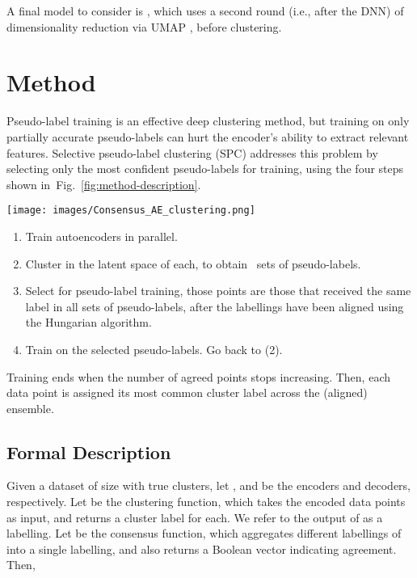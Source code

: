 \documentclass[runningheads]{llncs}
\begin{document}
A final model to consider is \cite{mcconville2019n2d}, which uses a second round (i.e., after the DNN) of dimensionality reduction via UMAP \cite{mcinnes2018umap}, before clustering.



 \section{Method} \label{sec:method}
 Pseudo-label training is an effective deep clustering method, but training on only partially accurate pseudo-labels can hurt the encoder's ability to extract relevant features. Selective pseudo-label clustering (SPC) addresses this problem by selecting only the most confident pseudo-labels for training, using the four steps shown in~Fig.~\ref{fig:method-description}. 

\begin{figure*}[t]
    \centering
    \texttt{[image: images/Consensus\_AE\_clustering.png]}
    \caption{ \small The complete SPC method. (1) Pretrain autoencoders. (2)~Perform multiple clusterings independently. (3) Identify agreed points as those that receive the same label in all ensemble members. (4) Perform pseudo-label training on agreed points and autoencoder training on unagreed points. Steps (2)--(4) are looped until the number of agreed points stops increasing.}
    \label{fig:method-description}
    \vspace{-3ex}
\end{figure*}


\begin{enumerate}
\item Train  autoencoders in parallel.
    \item Cluster in the latent space of each, to obtain~ sets of pseudo-labels.
    \item Select for pseudo-label training, those points are those that received the same label in all  sets of pseudo-labels, after the labellings have been aligned using the Hungarian algorithm.
    \item Train on the selected pseudo-labels. Go back to (2).
\end{enumerate} 
Training ends when the number of agreed points stops increasing. Then, each data point is assigned  its most common cluster label across the (aligned) ensemble. 


\subsection{Formal Description} \label{subsec:formal-description}
Given a dataset  of size  with  true clusters, let , and  be the  encoders and decoders, respectively. 
Let  be the clustering function, which takes the  encoded data points as input, and returns a cluster label for each. We refer to the output of  as a labelling. Let  be the consensus function, which aggregates  different labellings of  into a single labelling, and also returns a Boolean vector indicating agreement. Then, 
\end{document}
